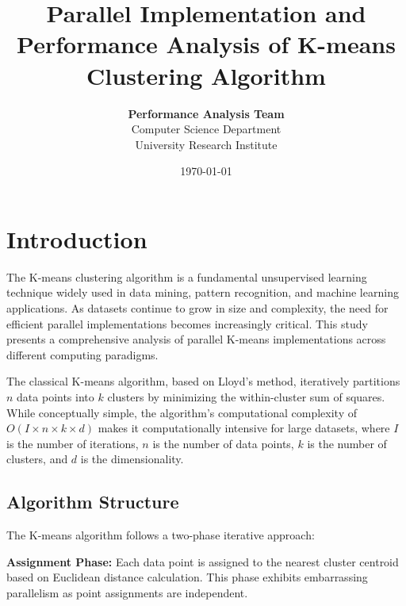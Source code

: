 \documentclass[10pt,a4paper,twocolumn]{article}
\title{\Large\textbf{Parallel Implementation and Performance Analysis of K-means Clustering Algorithm}}
\author{
\textbf{Performance Analysis Team}\\
Computer Science Department\\
University Research Institute
}
\date{\today}
\begin{document}

\section{Introduction}

The K-means clustering algorithm is a fundamental unsupervised learning technique widely used in data mining, pattern recognition, and machine learning applications. As datasets continue to grow in size and complexity, the need for efficient parallel implementations becomes increasingly critical. This study presents a comprehensive analysis of parallel K-means implementations across different computing paradigms.

The classical K-means algorithm, based on Lloyd's method, iteratively partitions $n$ data points into $k$ clusters by minimizing the within-cluster sum of squares. While conceptually simple, the algorithm's computational complexity of $O(I \times n \times k \times d)$ makes it computationally intensive for large datasets, where $I$ is the number of iterations, $n$ is the number of data points, $k$ is the number of clusters, and $d$ is the dimensionality.

\subsection{Algorithm Structure}

The K-means algorithm follows a two-phase iterative approach:

\textbf{Assignment Phase:} Each data point is assigned to the nearest cluster centroid based on Euclidean distance calculation. This phase exhibits embarrassing parallelism as point assignments are independent.
\end{document}
